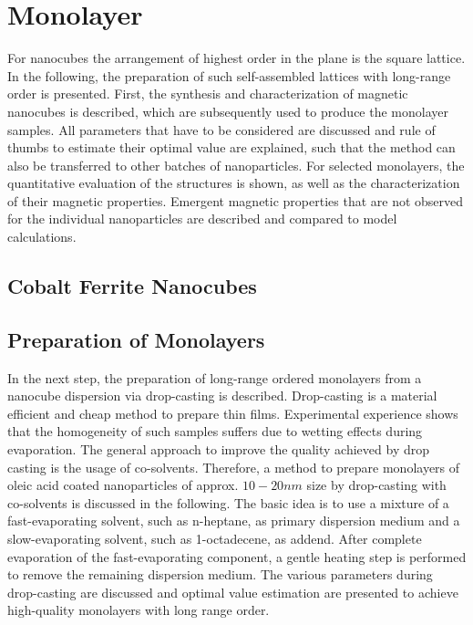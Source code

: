 \documentclass[\main/dresen_thesis.tex]{subfiles}
\renewcommand{\thisPath}{\main/chapters/monolayers}
\begin{document}
  \chapter{Monolayer}\label{ch:monolayers}
    For nanocubes the arrangement of highest order in the plane is the square lattice.
    In the following, the preparation of such self-assembled lattices with long-range order is presented.
    First, the synthesis and characterization of magnetic nanocubes is described, which are subsequently used to produce the monolayer samples.
    All parameters that have to be considered are discussed and rule of thumbs to estimate their optimal value are explained, such that the method can also be transferred to other batches of nanoparticles.
    For selected monolayers, the quantitative evaluation of the structures is shown, as well as the characterization of their magnetic properties. Emergent magnetic properties that are not observed for the individual nanoparticles are described and compared to model calculations.

    \section{Cobalt Ferrite Nanocubes}
      

    \section{Preparation of Monolayers}
      In the next step, the preparation of long-range ordered monolayers from a nanocube dispersion via drop-casting is described.
      Drop-casting is a material efficient and cheap method to prepare thin films.
      Experimental experience shows that the homogeneity of such samples suffers due to wetting effects during evaporation.
      The general approach to improve the quality achieved by drop casting is the usage of co-solvents.
      Therefore, a method to prepare monolayers of oleic acid coated nanoparticles of approx. $10 - 20 \unit{nm}$ size by drop-casting with co-solvents is discussed in the following.
      The basic idea is to use a mixture of a fast-evaporating solvent, such as n-heptane, as primary dispersion medium and a slow-evaporating solvent, such as 1-octadecene, as addend.
      After complete evaporation of the fast-evaporating component, a gentle heating step is performed to remove the remaining dispersion medium.
      The various parameters during drop-casting are discussed and optimal value estimation are presented to achieve high-quality monolayers with long range order.
\end{document}
